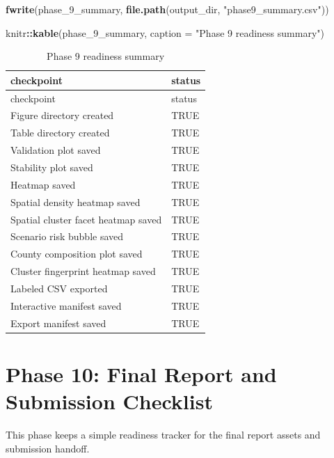 \documentclass[
]{article}
\newenvironment{Shaded}{\begin{snugshade}}{\end{snugshade}}
\newcommand{\AttributeTok}[1]{\textcolor[rgb]{0.13,0.29,0.53}{#1}}
\newcommand{\FunctionTok}[1]{\textcolor[rgb]{0.13,0.29,0.53}{\textbf{#1}}}
\newcommand{\NormalTok}[1]{#1}
\newcommand{\SpecialCharTok}[1]{\textcolor[rgb]{0.81,0.36,0.00}{\textbf{#1}}}
\newcommand{\StringTok}[1]{\textcolor[rgb]{0.31,0.60,0.02}{#1}}
\begin{document}
\begin{Shaded}
\begin{Highlighting}[]
\FunctionTok{fwrite}\NormalTok{(phase\_9\_summary, }\FunctionTok{file.path}\NormalTok{(output\_dir, }\StringTok{"phase9\_summary.csv"}\NormalTok{))}

\NormalTok{knitr}\SpecialCharTok{::}\FunctionTok{kable}\NormalTok{(phase\_9\_summary, }\AttributeTok{caption =} \StringTok{"Phase 9 readiness summary"}\NormalTok{)}
\end{Highlighting}
\end{Shaded}

\begin{longtable}[]{@{}ll@{}}
\caption{Phase 9 readiness summary}\tabularnewline
\toprule\noalign{}
checkpoint & status \\
\midrule\noalign{}
\endfirsthead
\toprule\noalign{}
checkpoint & status \\
\midrule\noalign{}
\endhead
\bottomrule\noalign{}
\endlastfoot
Figure directory created & TRUE \\
Table directory created & TRUE \\
Validation plot saved & TRUE \\
Stability plot saved & TRUE \\
Heatmap saved & TRUE \\
Spatial density heatmap saved & TRUE \\
Spatial cluster facet heatmap saved & TRUE \\
Scenario risk bubble saved & TRUE \\
County composition plot saved & TRUE \\
Cluster fingerprint heatmap saved & TRUE \\
Labeled CSV exported & TRUE \\
Interactive manifest saved & TRUE \\
Export manifest saved & TRUE \\
\end{longtable}

\section{Phase 10: Final Report and Submission
Checklist}\label{phase-10-final-report-and-submission-checklist}

This phase keeps a simple readiness tracker for the final report assets
and submission handoff.
\end{document}
